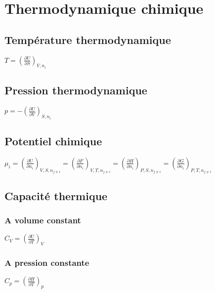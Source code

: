 \documentclass[a4paper, 11pt, hidelinks]{article}
\begin{document}
\section{Thermodynamique chimique}


\subsection{Température thermodynamique}
${\displaystyle T=\left({\frac {\partial U}{\partial S}}\right)_{V,n_i}}$


\subsection{Pression thermodynamique}

${\displaystyle p=-\left({\frac {\partial U}{\partial V}}\right)_{S,n_i}}$


\subsection{Potentiel chimique}

${\displaystyle \mu _{i}=\left({\frac  {\partial U}{\partial n_{i}}}\right)_{{V,S,n_{{j\neq i}}}}=\left({\frac  {\partial F}{\partial n_{i}}}\right)_{{V,T,n_{{j\neq i}}}}=\left({\frac  {\partial H}{\partial n_{i}}}\right)_{{P,S,n_{{j\neq i}}}}=\left({\frac  {\partial G}{\partial n_{i}}}\right)_{{P,T,n_{{j\neq i}}}}}$


\subsection{Capacité thermique}



\subsubsection{A volume constant}

${\displaystyle C_{V}=\left({\frac {\partial U}{\partial T}}\right)_{V}}$



\subsubsection{A pression constante}

${\displaystyle C_{p}=\left({\frac {\partial H}{\partial T}}\right)_{p}}$
\end{document}
